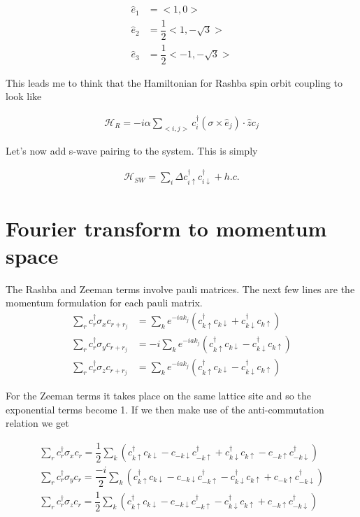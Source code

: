 \begin{align}
  \hat{e}_1 &= <1,0> \\
  \hat{e}_2 &= \dfrac{1}{2}<1,-\sqrt{3}> \\
  \hat{e}_3 &= \dfrac{1}{2}<-1,-\sqrt{3}>
\end{align}

This leads me to think that the Hamiltonian for Rashba spin orbit coupling to look like

\begin{align}
  \mathcal{H}_R = -i\alpha\sum_{<i,j>} c^{\dagger}_i (\sigma \times \hat{e}_j)\cdot \hat{z} c_j
\end{align}

Let's now add s-wave pairing to the system. This is simply

\begin{align}
  \mathcal{H}_{SW} = \sum\limits_i \Delta c^{\dagger}_{i\uparrow} c^{\dagger}_{i\downarrow} + h.c.
\end{align}

\section{Fourier transform to momentum space}

The Rashba and Zeeman terms involve pauli matrices. The next few lines are the momentum formulation for each pauli matrix. 
\begin{align}
  \sum\limits_{r} c^{\dagger}_{r}\sigma_x c_{r+r_j} &= \sum\limits_{k} e^{-iak_j}(c^{\dagger}_{k\uparrow}c_{k\downarrow} + c^{\dagger}_{k\downarrow}c_{k\uparrow}) \\
  \sum\limits_{r} c^{\dagger}_{r}\sigma_y c_{r+r_j} &= -i \sum\limits_{k} e^{-iak_j}(c^{\dagger}_{k\uparrow}c_{k\downarrow} - c^{\dagger}_{k\downarrow}c_{k\uparrow}) \\
  \sum\limits_{r} c^{\dagger}_{r}\sigma_z c_{r+r_j} &= \sum\limits_{k} e^{-iak_j}(c^{\dagger}_{k\uparrow}c_{k\downarrow} - c^{\dagger}_{k\downarrow}c_{k\uparrow})
\end{align}

For the Zeeman terms it takes place on the same lattice site and so the exponential terms become 1. If we then make use of the anti-commutation relation we get

\begin{align}
  \sum\limits_{r} c^{\dagger}_{r}\sigma_x c_{r} = \dfrac{1}{2} \sum\limits_{k} (c^{\dagger}_{k\uparrow}c_{k\downarrow} - c_{-k\downarrow}c^{\dagger}_{-k\uparrow} + c^{\dagger}_{k\downarrow}c_{k\uparrow}- c_{-k\uparrow}c^{\dagger}_{-k\downarrow}) \\
  \sum\limits_{r} c^{\dagger}_{r}\sigma_y c_{r} = \dfrac{-i}{2} \sum\limits_{k} (c^{\dagger}_{k\uparrow}c_{k\downarrow} - c_{-k\downarrow}c^{\dagger}_{-k\uparrow} - c^{\dagger}_{k\downarrow}c_{k\uparrow}+ c_{-k\uparrow}c^{\dagger}_{-k\downarrow}) \\
  \sum\limits_{r} c^{\dagger}_{r}\sigma_z c_{r} = \dfrac{1}{2} \sum\limits_{k} (c^{\dagger}_{k\uparrow}c_{k\downarrow} - c_{-k\downarrow}c^{\dagger}_{-k\uparrow} - c^{\dagger}_{k\downarrow}c_{k\uparrow}+ c_{-k\uparrow}c^{\dagger}_{-k\downarrow}) 
\end{align}

